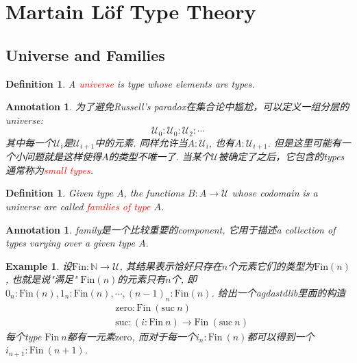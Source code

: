 \documentclass{article}
\newtheorem{example}[theorem]{Example}
\newtheorem{definition}[theorem]{Definition}
\newtheorem{annotation}[theorem]{Annotation}
\newcommand{\redt}[1]{\textcolor{red}{#1}}
\begin{document}
\newpage
\section{Martain L\"{o}f Type Theory}

\subsection{Universe and Families}

\begin{definition}
\rm A \redt{universe} is type whose elements are types.
\end{definition}

\begin{annotation}
\rm 为了避免Russell's paradox在集合论中尴尬，可以定义一组分层的universe:
\[
	\mathcal{U}_0 : \mathcal{U}_0 :\mathcal{U}_2 : \cdots
\]
其中每一个$\mathcal{U}_i$是$\mathcal{U}_{i+1}$中的元素. 同样允许当$A:\mathcal{U}_i$, 也有$A : \mathcal{U}_{i+1}$. 但是这里可能有一个小问题就是这样使得$A$的类型不唯一了. 当某个$\mathcal{U}$被确定了之后，它包含的types通常称为\redt{small types}.
\end{annotation}

\begin{definition}
\rm Given type $A$, the functions $B: A \to \mathcal{U}$ whose codomain is a universe are called \redt{families of type} $A$.
\end{definition}

\begin{annotation}
\rm family是一个比较重要的component, 它用于描述a collection of types varying over a given type $A$.
\end{annotation}

\begin{example}\label{ex:family_fin}
\rm 设$\text{Fin}:\mathbb{N} \to \mathcal{U}$, 其结果表示恰好只存在$n$个元素它们的类型为$\text{Fin}(n)$, 也就是说"满足" $\text{Fin}(n)$的元素只有$n$个, 即$0_{n}: \text{Fin}(n), 1_{n}: \text{Fin}(n), \cdots, (n-1)_n : \text{Fin}(n)$. 给出一个agdastdlib里面的构造
\[
    \begin{aligned}
    &\text{zero} : \text{Fin}~(\text{suc}~n) \\
    &\text{suc}  : (i : \text{Fin}~n) → \text{Fin} ~(\text{suc}~n)
    \end{aligned}
\]
每个type $\text{Fin}~n$都有一元素$\text{zero}$, 而对于每一个$i_{n} : \text{Fin}~(n)$都可以得到一个$i_{n+1} : \text{Fin}~(n+1)$.
\end{example}
\end{document}
